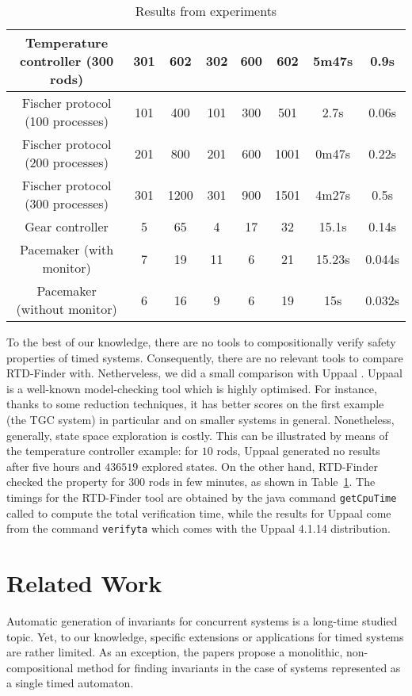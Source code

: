 \documentclass{LMCS}
\theoremstyle{plain}\newtheorem{remark}[thm]{Remark}
\theoremstyle{plain}\newtheorem{example}[thm]{Example}
\begin{document}
\begin{table}[htp]
{\begin{tabular}{|c|c|c|c|c|c|c|c|}
Temperature controller (300 rods) & 301 & 602 &  302 & 600 & 602 & 5m47s & 0.9s\tabularnewline
\hline \hline 
Fischer protocol (100 processes) & 101 & 400 & 101  & 300 & 501 & 2.7s & 0.06s \tabularnewline
\hline 
Fischer protocol (200 processes) & 201 & 800 & 201  & 600 & 1001 & 0m47s & 0.22s\tabularnewline
\hline 
Fischer protocol (300 processes) & 301 & 1200 &  301 & 900 & 1501 & 4m27s & 0.5s \tabularnewline
\hline \hline
Gear controller & 5 & 65 & 4 & 17 & 32 & 15.1s & 0.14s \tabularnewline
\hline \hline 
Pacemaker (with monitor) & 7 & 19 &  11 & 6 & 21 & 15.23s & 0.044s\tabularnewline
\hline 
Pacemaker (without monitor) & 6 & 16 &  9 & 6 & 19 & 15s & 0.032s\tabularnewline
\hline 
\end{tabular}
\caption{ Results from experiments} \label{tab:res}
}
\end{table}

To the best of our knowledge, there are no tools to compositionally
verify safety properties of timed systems. Consequently, there are no
relevant tools to compare RTD-Finder with. Netherveless, we did a
small comparison with Uppaal \cite{uppaal}. Uppaal is a well-known model-checking
tool which is highly optimised. For instance, thanks to some reduction
techniques, it has better scores on the first example (the TGC system)
in particular and on smaller systems in general.  Nonetheless,
generally, state space exploration is costly. This can be
illustrated by means of the temperature controller example: for
$10$ rods, Uppaal generated no results after five hours and $436519$
explored states. On the other hand, RTD-Finder checked the property for
$300$ rods in few minutes, as shown in Table~\ref{tab:res}.  The
timings for the RTD-Finder tool are obtained by the java command
\texttt{getCpuTime} called to compute the total verification time,
while the results for Uppaal come from the command \texttt{verifyta}
which comes with the Uppaal 4.1.14 distribution.




\section*{Related Work} 
Automatic generation of invariants for concurrent systems is a
long-time studied topic.  Yet, to our knowledge, specific extensions
or applications for timed systems are rather limited. As an exception,
the papers \cite{badban10:inv-ta,fietzke12:inv-ta} propose a
monolithic, non-compositional method for finding invariants in the
case of systems represented as a single timed automaton.
\end{document}
